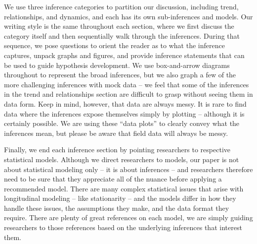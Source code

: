 \documentclass[english,,man]{apa6}
\theoremstyle{definition}
\theoremstyle{definition}
\theoremstyle{definition}
\theoremstyle{remark}
\begin{document}
We use three inference categories to partition our discussion, including
trend, relationships, and dynamics, and each has its own sub-inferences
and models. Our writing style is the same throughout each section, where
we first discuss the category itself and then sequentially walk through
the inferences. During that sequence, we pose questions to orient the
reader as to what the inference captures, unpack graphs and figures, and
provide inference statements that can be used to guide hypothesis
development. We use box-and-arrow diagrams throughout to represent the
broad inferences, but we also graph a few of the more challenging
inferences with mock data -- we feel that some of the inferences in the
trend and relationships section are difficult to grasp without seeing
them in data form. Keep in mind, however, that data are always messy. It
is rare to find data where the inferences expose themselves simply by
plotting -- although it is certainly possible. We are using these
\enquote{data plots} to clearly convey what the inferences mean, but
please be aware that field data will always be messy.

Finally, we end each inference section by pointing researchers to
respective statistical models. Although we direct researchers to models,
our paper is not about statistical modeling only -- it is about
inferences -- and researchers therefore need to be sure that they
appreciate all of the nuance before applying a recommended model. There
are many complex statistical issues that arise with longitudinal
modeling -- like stationarity -- and the models differ in how they
handle these issues, the assumptions they make, and the data format they
require. There are plenty of great references on each model, we are
simply guiding researchers to those references based on the underlying
inferences that interest them.
\end{document}
